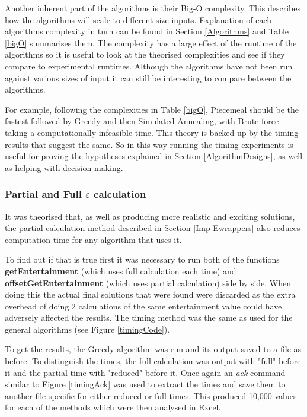 \documentclass[12pt]{report}
\begin{document}
Another inherent part of the algorithms is their Big-O complexity. This describes how the algorithms will scale to different size inputs. Explanation of each algorithms complexity in turn can be found in Section \ref{Algorithms} and Table \ref{bigO} summarises them. The complexity has a large effect of the runtime of the algorithms so it is useful to look at the theorised complexities and see if they compare to experimental runtimes. Although the algorithms have not been run against various sizes of input it can still be interesting to compare between the algorithms.

For example, following the complexities in Table \ref{bigO}, Piecemeal should be the fastest followed by Greedy and then Simulated Annealing, with Brute force taking a computationally infeasible time. This theory is backed up by the timing results that suggest the same. So in this way running the timing experiments is useful for proving the  hypotheses explained in Section \ref{AlgorithmDesigns}, as well as helping with decision making.

\subsubsection{Partial and Full $\varepsilon$ calculation}
It was theorised that, as well as producing more realistic and exciting solutions, the partial calculation method described in Section \ref{Imp-Ewrappers} also reduces computation time for any algorithm that uses it.

To find out if that is true first it was necessary to run both of the functions \textbf{getEntertainment} (which uses full calculation each time) and \textbf{offsetGetEntertainment} (which uses partial calculation) side by side. When doing this the actual final solutions that were found were discarded as the extra overhead of doing 2 calculations of the same entertainment value could have adversely affected the results. The timing method was the same as used for the general algorithms (see Figure \ref{timingCode}).

To get the results, the Greedy algorithm was run and its output saved to a file as before. To distinguish the times, the full calculation was output with "full" before it and the partial time with "reduced" before it. Once again an \textit{ack} command similar to Figure \ref{timingAck} was used to extract the times and save them to another file specific for either reduced or full times. This produced 10,000 values for each of the methods which were then analysed in Excel.
\end{document}
